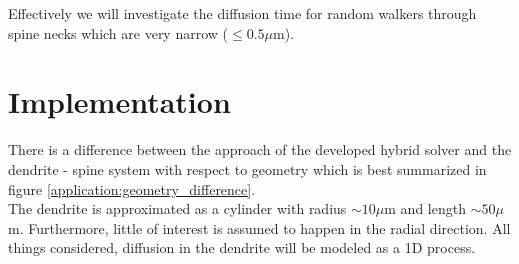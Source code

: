 Effectively we will investigate the diffusion time for random walkers through spine necks which are very narrow ($\leq0.5\mu$m). 

\section{Implementation}

There is a difference between the approach of the developed hybrid solver and the dendrite - spine system with respect to geometry which is best summarized in figure \ref{application:geometry_difference}.\\

\noindent The dendrite is approximated as a cylinder with radius $\sim10\mu$m and length $\sim50\mu$m. Furthermore, little of interest is assumed to happen in the radial direction. All things considered, diffusion in the dendrite will be modeled as a 1D process. \\

